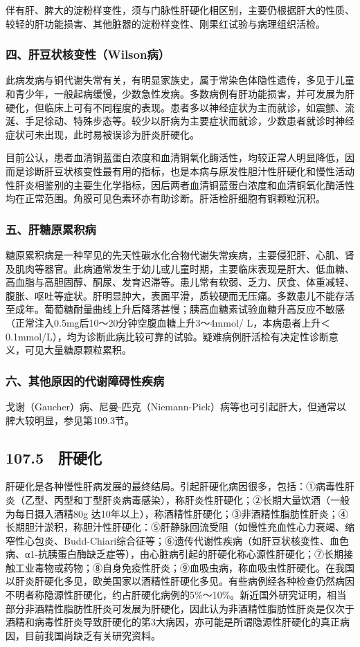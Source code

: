 伴有肝、脾大的淀粉样变性，须与门脉性肝硬化相区别，主要仍根据肝大的性质、较轻的肝功能损害、其他脏器的淀粉样变性、刚果红试验与病理组织活检。

\subsubsection{四、肝豆状核变性（Wilson病）}

此病发病与铜代谢失常有关，有明显家族史，属于常染色体隐性遗传，多见于儿童和青少年，一般起病缓慢，少数急性发病。多数病例有肝功能损害，并可发展为肝硬化，但临床上可有不同程度的表现。患者多以神经症状为主而就诊，如震颤、流涎、手足徐动、特殊步态等。较少以肝病为主要症状而就诊，少数患者就诊时神经症状可未出现，此时易被误诊为肝炎肝硬化。

目前公认，患者血清铜蓝蛋白浓度和血清铜氧化酶活性，均较正常人明显降低，因而是诊断肝豆状核变性最有用的指标，也是本病与原发性胆汁性肝硬化和慢性活动性肝炎相鉴别的主要生化学指标，因后两者血清铜蓝蛋白浓度和血清铜氧化酶活性均在正常范围。角膜可见色素环亦有助诊断。肝活检肝细胞有铜颗粒沉积。

\subsubsection{五、肝糖原累积病}

糖原累积病是一种罕见的先天性碳水化合物代谢失常疾病，主要侵犯肝、心肌、肾及肌肉等器官。此病通常发生于幼儿或儿童时期，主要临床表现是肝大、低血糖、高血脂与高胆固醇、酮尿、发育迟滞等。患儿常有软弱、乏力、厌食、体重减轻、腹胀、呕吐等症状。肝明显肿大，表面平滑，质较硬而无压痛。多数患儿不能存活至成年。葡萄糖耐量曲线上升后降落甚慢；胰高血糖素试验血糖升高反应不敏感（正常注入0.5mg后10～20分钟空腹血糖上升3～4mmol/
L，本病患者上升＜0.1mmol/L），均为诊断此病比较可靠的试验。疑难病例肝活检有决定性诊断意义，可见大量糖原颗粒累积。

\subsubsection{六、其他原因的代谢障碍性疾病}

戈谢（Gaucher）病、尼曼-匹克（Niemann-Pick）病等也可引起肝大，但通常以脾大较明显，参见第109.3节。

\subsection{107.5　肝硬化}

肝硬化是各种慢性肝病发展的最终结局。引起肝硬化病因很多，包括：①病毒性肝炎（乙型、丙型和丁型肝炎病毒感染），称肝炎性肝硬化；②长期大量饮酒（一般为每日摄入酒精80g
达10年以上），称酒精性肝硬化；③非酒精性脂肪性肝炎；④长期胆汁淤积，称胆汁性肝硬化：⑤肝静脉回流受阻（如慢性充血性心力衰竭、缩窄性心包炎、Budd-Chiari综合征等；⑥遗传代谢性疾病（如肝豆状核变性、血色病、α1-抗胰蛋白酶缺乏症等），由心脏病引起的肝硬化称心源性肝硬化；⑦长期接触工业毒物或药物；⑧自身免疫性肝炎；⑨血吸虫病，称血吸虫性肝硬化。在我国以肝炎肝硬化多见，欧美国家以酒精性肝硬化多见。有些病例经各种检查仍然病因不明者称隐源性肝硬化，约占肝硬化病例的5\%～10\%。新近国外研究证明，相当部分非酒精性脂肪性肝炎可发展为肝硬化，因此认为非酒精性脂肪性肝炎是仅次于酒精和病毒性肝炎导致肝硬化的笫3大病因，亦可能是所谓隐源性肝硬化的真正病因，目前我国尚缺乏有关研究资料。


